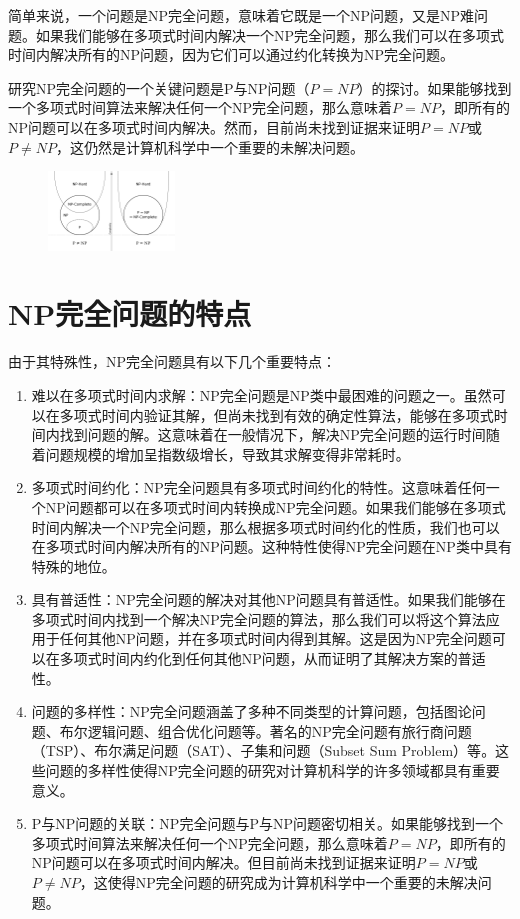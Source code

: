 \documentclass[UTF8,openany,zihao=5]{ctexbook}
\begin{document}
简单来说，一个问题是NP完全问题，意味着它既是一个NP问题，又是NP难问题。如果我们能够在多项式时间内解决一个NP完全问题，那么我们可以在多项式时间内解决所有的NP问题，因为它们可以通过约化转换为NP完全问题。

研究NP完全问题的一个关键问题是P与NP问题（$P=NP$）的探讨。如果能够找到一个多项式时间算法来解决任何一个NP完全问题，那么意味着$P=NP$，即所有的NP问题可以在多项式时间内解决。然而，目前尚未找到证据来证明$P=NP$或$P\ne NP$，这仍然是计算机科学中一个重要的未解决问题。
\vspace{10pt}
\begin{figure}[H]
  \begin{center}
    \includegraphics[width=0.3\textwidth]{images/P_np_np-complete_np-hard.svg.png}
    \centering
  \end{center}
\end{figure}

\section{NP完全问题的特点}

由于其特殊性，NP完全问题具有以下几个重要特点：

\begin{enumerate}
  \item 难以在多项式时间内求解：NP完全问题是NP类中最困难的问题之一。虽然可以在多项式时间内验证其解，但尚未找到有效的确定性算法，能够在多项式时间内找到问题的解。这意味着在一般情况下，解决NP完全问题的运行时间随着问题规模的增加呈指数级增长，导致其求解变得非常耗时。
  \item 多项式时间约化：NP完全问题具有多项式时间约化的特性。这意味着任何一个NP问题都可以在多项式时间内转换成NP完全问题。如果我们能够在多项式时间内解决一个NP完全问题，那么根据多项式时间约化的性质，我们也可以在多项式时间内解决所有的NP问题。这种特性使得NP完全问题在NP类中具有特殊的地位。
  \item 具有普适性：NP完全问题的解决对其他NP问题具有普适性。如果我们能够在多项式时间内找到一个解决NP完全问题的算法，那么我们可以将这个算法应用于任何其他NP问题，并在多项式时间内得到其解。这是因为NP完全问题可以在多项式时间内约化到任何其他NP问题，从而证明了其解决方案的普适性。
  \item 问题的多样性：NP完全问题涵盖了多种不同类型的计算问题，包括图论问题、布尔逻辑问题、组合优化问题等。著名的NP完全问题有旅行商问题（TSP）、布尔满足问题（SAT）、子集和问题（Subset Sum Problem）等\cite{bi:KRM}。这些问题的多样性使得NP完全问题的研究对计算机科学的许多领域都具有重要意义。
  \item P与NP问题的关联：NP完全问题与P与NP问题密切相关。如果能够找到一个多项式时间算法来解决任何一个NP完全问题，那么意味着$P=NP$，即所有的NP问题可以在多项式时间内解决。但目前尚未找到证据来证明$P=NP$或$P\ne NP$，这使得NP完全问题的研究成为计算机科学中一个重要的未解决问题。
\end{enumerate}
\end{document}
